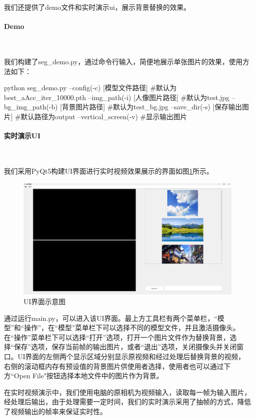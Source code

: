 \documentclass[11pt]{article}
\begin{document}
我们还提供了demo文件和实时演示ui，展示背景替换的效果。
\paragraph{Demo}~{}

我们构建了seg_demo.py，通过命令行输入，简便地展示单张图片的效果，使用方法如下：

\begin{python}
	python seg_demo.py
	--config(-c) [模型文件路径]  		    	#默认为best_aAcc_iter_10000.pth
	--img_path(-i) [人像图片路径] 	      #默认为test.jpg
	--bg_img_path(-b) [背景图片路径] 	    #默认为test_bg.jpg
	--save_dir(-s) [保存输出图片]  		    #默认路径为output
	--vertical_screen(-v) 				        #显示输出图片
\end{python}


\paragraph{实时演示UI}~{}

我们采用PyQt5构建UI界面进行实时视频效果展示的界面如图\ref{fig:image11}所示。
\begin{figure}[H]
	\centering
	\includegraphics[width = 1\textwidth]{ui.png}
	\caption{UI界面示意图}
	\label{fig:image11}
\end{figure}
通过运行main.py，可以进入该UI界面。最上方工具栏有两个菜单栏，“模型”和“操作”，在“模型”菜单栏下可以选择不同的模型文件，并且激活摄像头。在“操作”菜单栏下可以选择“打开”选项，打开一个图片文件作为替换背景，选择“保存”选项，保存当前帧的输出图片，或者“退出”选项，关闭摄像头并关闭窗口。UI界面的左侧两个显示区域分别显示原视频和经过处理后替换背景的视频，右侧的滚动框内存有预设值的背景图片供使用者选择，使用者也可以通过下方“Open File"按钮选择本地文件中的图片作为背景。

在实时视频演示中，我们使用电脑的原相机为视频输入，读取每一帧为输入图片，经处理后输出，由于处理需要一定时间，我们的实时演示采用了抽帧的方式，降低了视频输出的帧率来保证实时性。
\end{document}
